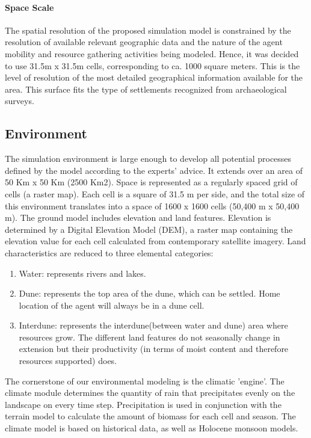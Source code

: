 \documentclass[11pt,oneside,a4paper,openright]{report}
\begin{document}
\paragraph{Space Scale}

The spatial resolution of the proposed simulation model is constrained by the resolution of available
relevant geographic data and the nature of the agent mobility and resource gathering activities being
modeled.
Hence, it was decided to use 31.5m x 31.5m cells, corresponding to ca. 1000 square meters. This is
the level of resolution of the most detailed geographical information available for the area. This surface
fits the type of settlements recognized from archaeological surveys.


\subsection{Environment}
The simulation environment is large enough to develop all potential processes defined by the model according to the
experts' advice. It extends over an area of 50 Km x 50 Km (2500 Km2). Space is represented as a regularly spaced grid
of cells (a raster map). Each cell is a square of 31.5 m per side, and the total size of this environment
translates into a space of 1600 x 1600 cells (50,400 m x 50,400 m).
The ground model includes elevation and land features. Elevation is determined by a Digital Elevation
Model (DEM), a raster map containing the elevation value for each cell calculated from contemporary
satellite imagery. Land characteristics are reduced to three elemental categories:

\begin{enumerate}
\item Water: represents rivers and lakes.
\item Dune: represents the top area of the dune, which can be settled. Home location of the
agent will always be in a dune cell.
\item Interdune: represents the interdune(between water and dune) area where resources grow. The different land
features do not seasonally change in extension but their productivity (in terms of moist content
and therefore resources supported) does.
\end{enumerate}

The cornerstone of our environmental modeling is the climatic 'engine'. The climate module
determines the quantity of rain that precipitates evenly on the landscape on every time step.
Precipitation is used in conjunction with the terrain model to calculate the amount of biomass for each
cell and season. The climate model is based on historical data, as well as Holocene monsoon models.
\end{document}
